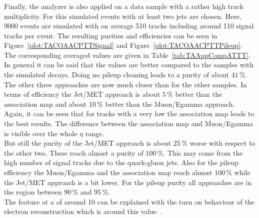 

\clearpage{}

\subsubsection{\ttbar \label{sec:TASEFRDACPTT}}
Finally, the analyzer is also applied on a data sample with a rather high track multiplicity. For this simulated \ttbar events with at least two jets are chosen. Here, 9000 events are simulated with on average 510 tracks including around 110 signal tracks per event. The resulting purities and efficiencies can be seen in Figure~\ref{plot:TACOAACPTTSignal} and Figure~\ref{plot:TACOAACPTTPileup}. The corresponding averaged values are given in Table~\ref{tab:TAAppCompATTT}. In general it can be said that the values are better compared to the samples with the simulated \Zz decays. Doing no pileup cleaning leads to a purity of about $41\,\%$. The other three approaches are now much closer than for the other samples. In terms of efficiency the Jet/MET approach is about $5\,\%$ better than the association map and about $10\,\%$ better than the Muon/Egamma approach. Again, it can be seen that for tracks with a very low \pt the association map leads to the best results. The difference between the association map and Muon/Egamma is visible over the whole $\eta$ range. \\
But still the purity of the Jet/MET approach is about $25\,\%$ worse with respect to the other two. These reach almost a purity of $100\,\%$. This may come from the high number of signal tracks due to the quark-gluon jets. Also for the pileup efficiency the Muon/Egamma and the association map reach almost $100\,\%$ while the Jet/MET approach is a bit lower. For the pileup purity all approaches are in the region between $90\,\%$ and $95\,\%$. \\
The feature at a \pt{} of around 10\GeV{} can be explained with the turn on behaviour of the electron reconstruction which is around this value~\cite{CMS-PAS-EGM-10-004}.

